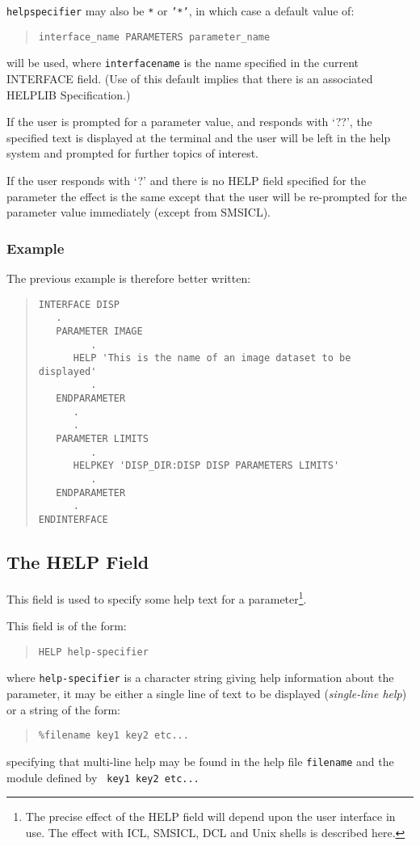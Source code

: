 \documentclass[twoside,11pt]{article}
\newcommand{\xlabel}[1]{}
\renewcommand{\_}{\texttt{\symbol{95}}}
\begin{document}
\texttt{help\_specifier}  may also be \texttt{*} or \texttt{'*'}, in which case a
default value of:
\begin{quote} \begin{verbatim}
interface_name PARAMETERS parameter_name
\end{verbatim} \end{quote}
will be used, where \texttt{interface\_name} is the name specified in the
current INTERFACE field.
(Use of this default implies that there is an associated HELPLIB Specification.)

If the user is prompted for a parameter value, and responds with `??',
the specified text is displayed at the terminal and the user will be left in
the help system and prompted for further topics of interest.

If the user responds with `?' and there is no HELP field specified for the
parameter the effect is the same except that the user
will be re-prompted for the parameter value immediately (except from SMSICL).

\subsubsection*{Example}
The previous example is therefore better written:
\begin{quote} \begin{verbatim}
INTERFACE DISP
   .
   PARAMETER IMAGE
         .
      HELP 'This is the name of an image dataset to be displayed'
         .
   ENDPARAMETER
      .
      .
   PARAMETER LIMITS
         .
      HELPKEY 'DISP_DIR:DISP DISP PARAMETERS LIMITS'
         .
   ENDPARAMETER
      .
ENDINTERFACE
\end{verbatim} \end{quote}

\subsection{The HELP Field\xlabel{the_help_field}}

This field is used to specify some help text for a parameter\footnote{
The precise effect of the HELP field will depend upon the user interface in use.
The effect with ICL, SMSICL, DCL and Unix shells is described here.}.

This field is of the form:
\begin{quote} \begin{verbatim}
HELP help-specifier
\end{verbatim} \end{quote}
where \texttt{help-specifier} is a character string giving help information about
the parameter, it may be either a single line of text to be displayed
({\em single-line help}) or a string of the form:
\begin{quote} \begin{verbatim}
%filename key1 key2 etc...
\end{verbatim} \end{quote}
specifying that multi-line help may be found in the help file
\texttt{filename} and the module defined by \texttt{ key1 key2 etc...}
\end{document}
